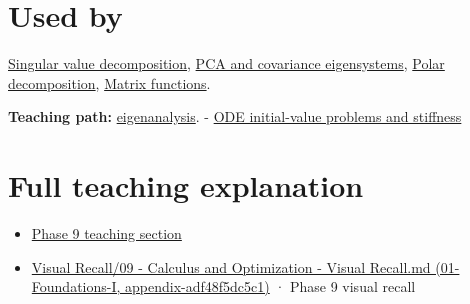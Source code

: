 \section{Used by}\label{appendix-0b3be18411f9-used-by}

\hyperref[appendix-1fad5e7f36fa]{Singular value decomposition}, \hyperref[appendix-ad175ef3c5bf]{PCA and covariance eigensystems}, \hyperref[appendix-73f5bcf7a462]{Polar decomposition}, \hyperref[appendix-0f4bc2bf2b1f]{Matrix functions}.

\textbf{Teaching path:} \href{Continuous\%20Notes/Computing\%20Foundations\%20-\%20From\%20Bits\%20to\%20C++\%20and\%20Systems\%20APIs\#Eigenvectors\%20reveal\%20the\%20directions\%20a\%20square\%20map\%20does\%20not\%20turn}{eigenanalysis}. - \hyperref[appendix-e8ab9836882e]{ODE initial-value problems and stiffness}

\section{Full teaching explanation}\label{appendix-0b3be18411f9-full-teaching-explanation}

\begin{itemize}
\tightlist
\item
  \href{Continuous\%20Notes/Computing\%20Foundations\%20-\%20From\%20Bits\%20to\%20C++\%20and\%20Systems\%20APIs\#ODEs\%20and\%20numerical\%20simulation}{Phase 9 teaching section}
\item
  \href{../01-Foundations-I/main.pdf\#nameddest=appendix-adf48f5dc5c1}{Visual Recall/09 - Calculus and Optimization - Visual Recall.md (01-Foundations-I, appendix-adf48f5dc5c1)} · Phase 9 visual recall
\end{itemize}
